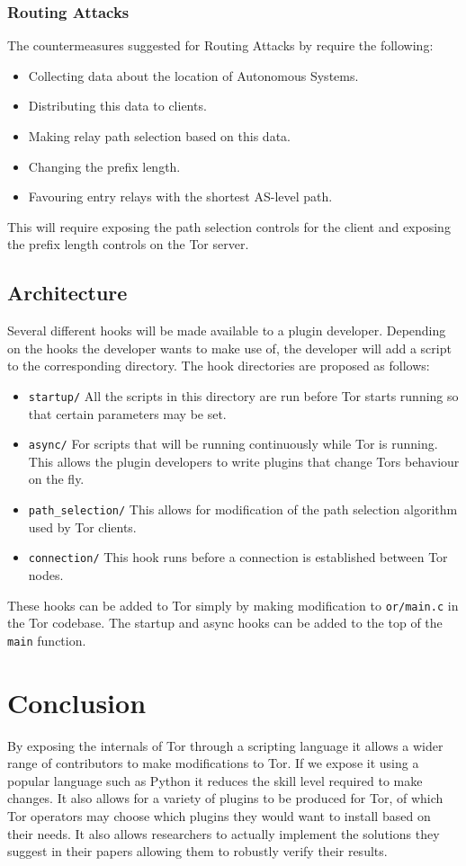 \documentclass[9pt,technote]{IEEEtran}
\begin{document}
\subsubsection{Routing Attacks}
The countermeasures suggested for Routing Attacks by \citeauthor{sun2015raptor} require the following:
\begin{itemize}
\item Collecting data about the location of Autonomous Systems.
\item Distributing this data to clients.
\item Making relay path selection based on this data.
\item Changing the prefix length.
\item Favouring entry relays with the shortest AS-level path.
\end{itemize}

This will require exposing the path selection controls for the client and exposing the prefix length controls on the Tor server.

\subsection{Architecture}
Several different hooks will be made available to a plugin developer. Depending on
the hooks the developer wants to make use of, the developer will add a script to
the corresponding directory. The hook directories are proposed as follows:
\begin{itemize}
\item \texttt{startup/} All the scripts in this directory are run before Tor starts
	running so that certain parameters may be set.
\item \texttt{async/} For scripts that will be running continuously while Tor is
	running. This allows the plugin developers to write plugins that change
	Tors behaviour on the fly.
\item \texttt{path\_selection/} This allows for modification of the path
	selection algorithm used by Tor clients.
\item \texttt{connection/} This hook runs before a connection is established
	between Tor nodes.
\end{itemize}
These hooks can be added to Tor simply by making modification to
\texttt{or/main.c} in the Tor codebase. The startup and async hooks can be added
to the top of the \texttt{main} function.


\section{Conclusion}
By exposing the internals of Tor through a scripting language it allows a wider
range of contributors to make modifications to Tor. If we expose it using a
popular language such as Python it reduces the skill level required to make
changes. It also allows for a variety of plugins to be produced for Tor, of
which Tor operators may choose which plugins they would want to install based
on their needs. It also allows researchers to actually implement the solutions
they suggest in their papers allowing them to robustly verify their results.



\end{document}
